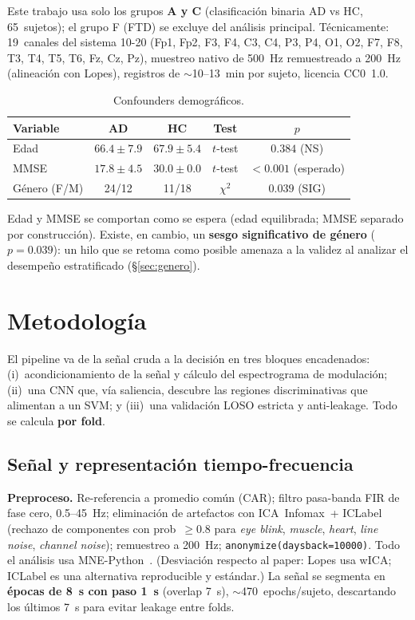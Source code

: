 \documentclass[11pt, a4paper]{article}
\begin{document}
Este trabajo usa solo los grupos \textbf{A y C} (clasificación binaria
AD vs HC, 65~sujetos); el grupo F (FTD) se excluye del análisis principal.
Técnicamente: 19~canales del sistema 10-20 (Fp1, Fp2, F3, F4, C3, C4, P3,
P4, O1, O2, F7, F8, T3, T4, T5, T6, Fz, Cz, Pz), muestreo nativo de
500~Hz remuestreado a 200~Hz (alineación con Lopes), registros de
$\sim$10--13~min por sujeto, licencia CC0~1.0.

\begin{table}[H]
\centering
\small
\begin{tabular}{lcccc}
\toprule
Variable & AD & HC & Test & $p$ \\
\midrule
Edad             & $66.4 \pm 7.9$ & $67.9 \pm 5.4$ & $t$-test & $0.384$ (NS) \\
MMSE             & $17.8 \pm 4.5$ & $30.0 \pm 0.0$ & $t$-test & $<0.001$ (esperado) \\
Género (F/M)     & 24/12 & 11/18 & $\chi^2$ & $\mathbf{0.039}$ (SIG) \\
\bottomrule
\end{tabular}
\caption{Confounders demográficos.}
\end{table}

Edad y MMSE se comportan como se espera (edad equilibrada; MMSE separado por
construcción). Existe, en cambio, un \textbf{sesgo significativo de género}
($p=0.039$): un hilo que se retoma como posible amenaza a la validez al
analizar el desempeño estratificado (§\ref{sec:genero}).

\section{Metodología}

El pipeline va de la señal cruda a la decisión en tres bloques encadenados:
(i)~acondicionamiento de la señal y cálculo del espectrograma de modulación;
(ii)~una CNN que, vía saliencia, descubre las regiones discriminativas que
alimentan a un SVM; y (iii)~una validación LOSO estricta y anti-leakage.
Todo se calcula \textbf{por fold}.

\subsection{Señal y representación tiempo-frecuencia}
\label{sec:signal_tf}

\textbf{Preproceso.} Re-referencia a promedio común (CAR); filtro pasa-banda
FIR de fase cero, 0.5--45~Hz; eliminación de artefactos con ICA~Infomax~+
ICLabel~\cite{PionTonachini2019} (rechazo de componentes con
prob~$\geq 0.8$ para \emph{eye blink}, \emph{muscle}, \emph{heart},
\emph{line noise}, \emph{channel noise}); remuestreo a 200~Hz;
\texttt{anonymize(daysback=10000)}. Todo el análisis usa
MNE-Python~\cite{Gramfort2013}. (Desviación respecto al paper: Lopes usa
wICA; ICLabel es una alternativa reproducible y estándar.) La señal se
segmenta en \textbf{épocas de 8~s con paso 1~s} (overlap 7~s),
$\sim$470~epochs/sujeto, descartando los últimos 7~s para evitar leakage
entre folds.
\end{document}
